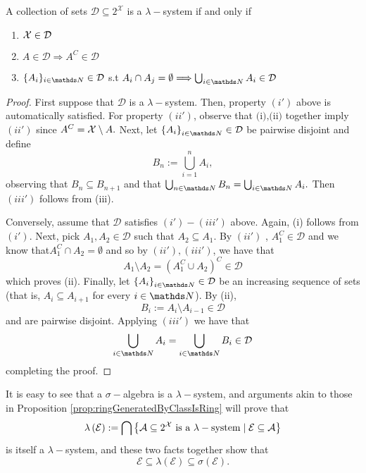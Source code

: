 \begin{prop}
\label{prop:dynkinSystemEquivDefn}A collection of sets $\mathcal{D\subseteq}2^{\mathcal{X}}$
is a $\lambda-$system if and only if

\begin{enumerate}[label=(\roman*'),leftmargin=.1\linewidth,rightmargin=.4\linewidth]
	\item $ \mathcal{X} \in \mathcal{D} $
	\item $ A \in \mathcal{D} \Longrightarrow A^C \in \mathcal{D} $
	\item $\{A_i\}_{i\in\N} \in \mathcal{D}$ s.t $A_i \cap A_j = \emptyset \Longrightarrow \bigcup_{i\in\N} A_i \in \mathcal{D}$
\end{enumerate}
\end{prop}

\begin{proof}
First suppose that $\mathcal{D}$ is a $\lambda-$system. Then, property
$(i')$ above is automatically satisfied. For property $(ii')$, observe
that $\text{(i),(ii})$ together imply $(ii')$ since $A^{C}=\mathcal{X}\setminus A.$
Next, let $\left\{ A_{i}\right\} _{i\in\N}\in\mathcal{D}$ be pairwise
disjoint and define 
\[
B_{n}:=\bigcup_{i=1}^{n}A_{i},
\]
observing that $B_{n}\subseteq B_{n+1}$ and that $\bigcup_{n\in\N}B_{n}=\bigcup_{i\in\N}A_{i}.$
Then $(iii')$ follows from (iii).

Conversely, assume that $\mathcal{D}$ satisfies $(i')-(iii')$ above.
Again, (i) follows from $(i')$. Next, pick $A_{1},A_{2}\in\mathcal{D}$
such that $A_{2}\subseteq A_{1}$. By $(ii')$ , $A_{1}^{C}\in\mathcal{D}$
and we know that$A_{1}^{C}\cap A_{2}=\emptyset$ and so by $\left(ii'\right),\left(iii'\right)$,
we have that
\[
A_{1}\setminus A_{2}=\left(A_{1}^{C}\cup A_{2}\right)^{C}\in\mathcal{D}
\]
which proves (ii). Finally, let $\left\{ A_{i}\right\} _{i\in\N}\in\mathcal{D}$
be an increasing sequence of sets (that is, $A_{i}\subseteq A_{i+1}$
for every $i\in\N$). By (ii), 
\[
B_{i}:=A_{i}\setminus A_{i-1}\in\mathcal{D}
\]
 and are pairwise disjoint. Applying $(iii')$ we have that
\[
\bigcup_{i\in\N}A_{i}=\bigcup_{i\in\N}B_{i}\in\mathcal{D}
\]
completing the proof.
\end{proof}
It is easy to see that a $\sigma-$algebra is a $\lambda-$system,
and arguments akin to those in Proposition \ref{prop:ringGeneratedByClassIsRing}
will prove that
\[
\lambda\left(\mathcal{E}\right):=\bigcap\left\{ \mathcal{A}\subseteq2^{\mathcal{X}}\text{ is a }\lambda-\text{system}\mid\mathcal{E}\subseteq\mathcal{A}\right\} 
\]
is itself a $\lambda-$system, and these two facts together show that
\[
\mathcal{E}\subseteq\lambda\left(\mathcal{E}\right)\subseteq\sigma\left(\mathcal{E}\right).
\]

